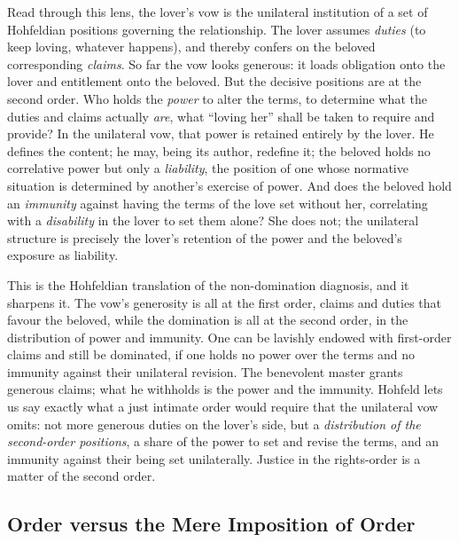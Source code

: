 \documentclass[11pt,a4paper]{article}
\begin{document}
Read through this lens, the lover's vow is the unilateral institution of a set of Hohfeldian positions governing the relationship. The lover assumes \emph{duties} (to keep loving, whatever happens), and thereby confers on the beloved corresponding \emph{claims}. So far the vow looks generous: it loads obligation onto the lover and entitlement onto the beloved. But the decisive positions are at the second order. Who holds the \emph{power} to alter the terms, to determine what the duties and claims actually \emph{are}, what ``loving her'' shall be taken to require and provide? In the unilateral vow, that power is retained entirely by the lover. He defines the content; he may, being its author, redefine it; the beloved holds no correlative power but only a \emph{liability}, the position of one whose normative situation is determined by another's exercise of power. And does the beloved hold an \emph{immunity} against having the terms of the love set without her, correlating with a \emph{disability} in the lover to set them alone? She does not; the unilateral structure is precisely the lover's retention of the power and the beloved's exposure as liability.

This is the Hohfeldian translation of the non-domination diagnosis, and it sharpens it. The vow's generosity is all at the first order, claims and duties that favour the beloved, while the domination is all at the second order, in the distribution of power and immunity. One can be lavishly endowed with first-order claims and still be dominated, if one holds no power over the terms and no immunity against their unilateral revision. The benevolent master grants generous claims; what he withholds is the power and the immunity. Hohfeld lets us say exactly what a just intimate order would require that the unilateral vow omits: not more generous duties on the lover's side, but a \emph{distribution of the second-order positions}, a share of the power to set and revise the terms, and an immunity against their being set unilaterally. Justice in the rights-order is a matter of the second order.

\subsection{Order versus the Mere Imposition of Order}
\end{document}
